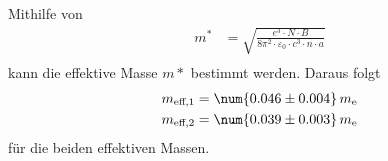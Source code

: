 Mithilfe von 
\begin{equation*}
    \begin{split}
        m^\ast &= \sqrt{\frac{e^3 \cdot N \cdot B}{8 \pi^2 \cdot \varepsilon_0 \cdot c^3 \cdot n \cdot a}} \\
    \end{split}
\end{equation*}
kann die effektive Masse $m*$ bestimmt werden.
Daraus folgt
\begin{align*}
    m_{\text{eff},1} &= \num{0.046 \pm 0.004} \, m_{\text{e}} \\
    m_{\text{eff},2} &= \num{0.039 \pm 0.003} \, m_{\text{e}}
\end{align*}
für die beiden effektiven Massen.
\clearpage